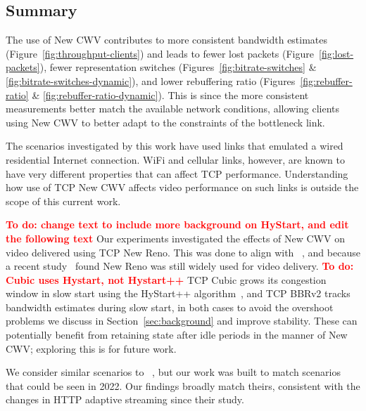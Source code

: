 \documentclass[10pt, acmlarge]{acmart}
\newcommand{\todo}[1]{\textbf{\textcolor{red}{To do: #1}}}
\begin{document}
\subsection{Summary}
\label{sec:summary}


The use of New CWV contributes to more consistent bandwidth estimates 
(Figure~\ref{fig:throughput-clients}) and leads to fewer lost packets 
(Figure~\ref{fig:lost-packets}), fewer representation switches 
(Figures~\ref{fig:bitrate-switches} \& \ref{fig:bitrate-switches-dynamic}),
 and lower rebuffering ratio (Figures~\ref{fig:rebuffer-ratio} \& 
 \ref{fig:rebuffer-ratio-dynamic}).
This is since the more consistent measurements better match the available network conditions,
 allowing clients using New CWV to better adapt to the constraints of the bottleneck link. 

The scenarios investigated by this work have used links that emulated a wired
residential Internet connection.  WiFi and cellular links, however, are known
to have very different properties that can affect TCP performance. Understanding
how use of TCP New CWV affects video performance on such links is outside the
scope of this current work.

\todo{change text to include more background on HyStart, and edit the following text}
Our experiments investigated the effects of New CWV on video delivered
using TCP New Reno. This was done to align with
~\cite{Nazir-2014-performance-evaluation-congestion-window-validation-dash-newcwv},
and because a recent study~\cite{Mishra-2019-the-great-internet-tcp-congestion-control-census}
found New Reno was still widely used for video delivery.
%
\todo{Cubic uses Hystart, not Hystart++}
TCP Cubic grows its congestion window in slow start using the HyStart++
algorithm~\cite{draft-ietf-tcpm-hystartplusplus}, and TCP BBRv2 tracks
bandwidth estimates during slow start, in both cases to avoid the overshoot
problems we discuss in Section~\ref{sec:background} and improve stability.
These can potentially benefit from retaining state after idle periods in
the manner of New CWV; exploring this is for future work.

We consider similar scenarios to
~\cite{Nazir-2014-performance-evaluation-congestion-window-validation-dash-newcwv},
but our work was built to match scenarios that could be seen in 2022. 
Our findings broadly match theirs, consistent with the changes in HTTP adaptive 
streaming since their study.
\end{document}
